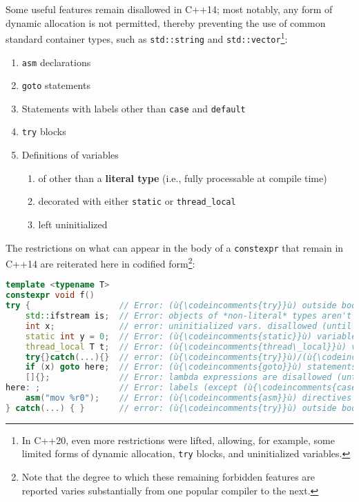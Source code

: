 \noindent Some useful features remain disallowed in C++14; most notably, any form
of dynamic allocation is not permitted, thereby preventing the use of
common standard container types, such as \texttt{std::string} and
\texttt{std::vector}{\cprotect\footnote{In C++20, even more
restrictions were lifted, allowing, for example, some limited forms of
  dynamic allocation, \texttt{try} blocks, and uninitialized variables.}}:
\begin{enumerate}
\item{\texttt{asm} declarations}
\item{\texttt{goto} statements}
\item{Statements with labels other than \texttt{case} and \texttt{default}}
\item{\texttt{try} blocks}
\item{Definitions of variables
\begin{enumerate}
\item{of other than a \textbf{literal type} (i.e., fully processable at compile time)}
\item{decorated with either \texttt{static} or \texttt{thread\_local}}
\item{left uninitialized}
\end{enumerate}
}
\end{enumerate}
The restrictions on what can appear in the body of a \texttt{constexpr}
that remain in C++14 are reiterated here in codified
form\footnote{Note that the degree to which these remaining forbidden features are reported varies substantially from one popular compiler to the next.}:

\begin{lstlisting}[language=C++]
template <typename T>
constexpr void f()
try {                  // Error: (ù{\codeincomments{try}}ù) outside body isn't allowed (until C++20).
    std::ifstream is;  // Error: objects of *non-literal* types aren't allowed.
    int x;             // error: uninitialized vars. disallowed (until C++20)
    static int y = 0;  // Error: (ù{\codeincomments{static}}ù) variables are disallowed.
    thread_local T t;  // Error: (ù{\codeincomments{thread\_local}}ù) variables are disallowed.
    try{}catch(...){}  // error: (ù{\codeincomments{try}}ù)/(ù{\codeincomments{catch}}ù) disallowed (until C++20)
    if (x) goto here;  // Error: (ù{\codeincomments{goto}}ù) statements are disallowed.
    []{};              // Error: lambda expressions are disallowed (until C++17).
here: ;                // Error: labels (except (ù{\codeincomments{case}}ù)/(ù{\codeincomments{default}}ù)) aren't allowed.
    asm("mov %r0");    // Error: (ù{\codeincomments{asm}}ù) directives are disallowed.
} catch(...) { }       // error: (ù{\codeincomments{try}}ù) outside body disallowed (until C++20)
\end{lstlisting}
    

